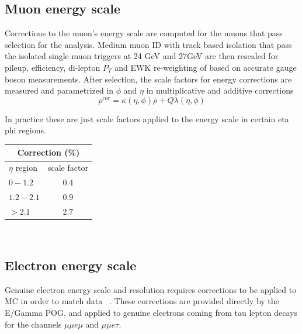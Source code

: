 \subsection{Muon energy scale}
Corrections to the muon's energy scale are computed for the muons that pass selection for the analysis. Medium muon ID with track based isolation that pass the isolated single muon triggers at 24 GeV and 27GeV are then rescaled for pileup, efficiency, di-lepton $P_T$ and EWK re-weighting of based on accurate gauge boson measurements. After selection, the scale factors for energy corrections are measured and parametrized in $\phi$ and $\eta$ in multiplicative and additive corrections 
\begin{equation}\rho^{\text{cor}}=\kappa(\eta,\phi)\rho+Q \lambda(\eta,\phi)\end{equation} 

In practice these are just scale factors applied to the energy scale in certain eta phi regions. \\
\begin{table}[h]
  \begin{center}
    \label{tab:MES}
    \begin{tabular} { l | c }
      \hline \multicolumn{2}{c}{Correction (\%)} \\
      \hline $\eta$ region & scale factor  \\ \hline
      $0 - 1.2$ & $0.4$ \\ 
      $1.2 - 2.1 $& $0.9 $\\ 
      $> 2.1$ & $2.7$ \\ 
    \end{tabular}
  \end{center}
\end{table}\\

\subsection{Electron energy scale}

Genuine electron energy scale and resolution requires corrections to be applied to MC in order to match data ~\cite{EGammaEnergyScale}. These corrections are provided directly by the E/Gamma POG, and applied to genuine electrons coming from tau lepton decays for the channels $\mu\mu e \mu$ and $\mu\mu e \tau$.


